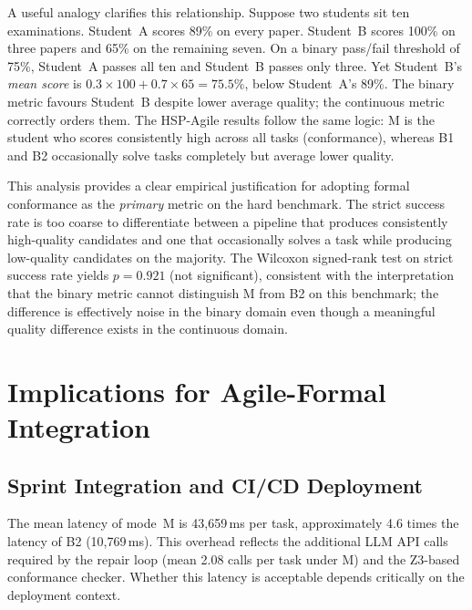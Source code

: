 A useful analogy clarifies this relationship.  Suppose two students sit ten examinations.
Student~A scores 89\% on every paper.  Student~B scores 100\% on three papers and 65\% on
the remaining seven.  On a binary pass/fail threshold of 75\%, Student~A passes all ten and
Student~B passes only three.  Yet Student~B's \emph{mean score} is $0.3 \times 100 + 0.7
\times 65 = 75.5\%$, below Student~A's 89\%.  The binary metric favours Student~B despite
lower average quality; the continuous metric correctly orders them.  The HSP-Agile results
follow the same logic: M is the student who scores consistently high across all tasks
(conformance), whereas B1 and B2 occasionally solve tasks completely but average lower
quality.

This analysis provides a clear empirical justification for adopting formal conformance as
the \emph{primary} metric on the hard benchmark.  The strict success rate is too coarse to
differentiate between a pipeline that produces consistently high-quality candidates and one
that occasionally solves a task while producing low-quality candidates on the majority.
The Wilcoxon signed-rank test on strict success rate yields $p = 0.921$ (not significant),
consistent with the interpretation that the binary metric cannot distinguish M from B2 on
this benchmark; the difference is effectively noise in the binary domain even though a
meaningful quality difference exists in the continuous domain.

\section{Implications for Agile-Formal Integration}
\label{sec:disc:implications}

\subsection{Sprint Integration and CI/CD Deployment}

The mean latency of mode~M is 43{,}659\,ms per task, approximately 4.6 times the latency
of B2 (10{,}769\,ms).  This overhead reflects the additional LLM API calls required by the
repair loop (mean 2.08 calls per task under M) and the Z3-based conformance checker.
Whether this latency is acceptable depends critically on the deployment context.

